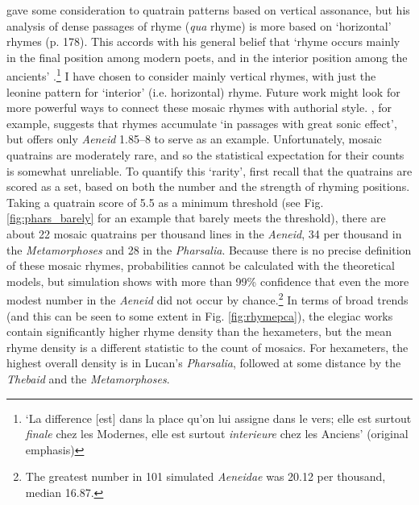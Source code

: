 \documentclass[twocolumn, switch, a4paper]{article} %
\begin{document}
  gave some consideration to quatrain
patterns based on vertical assonance, but his analysis of dense passages of
rhyme (\emph{qua} rhyme) is more based on `horizontal' rhymes (p. 178). This
accords with his general belief that `rhyme occurs mainly in the final
position among modern poets, and in the interior position among the ancients'
\cite[175]{herescu_poesie_1960}.\footnote{
  `La difference [est] dans la place qu'on lui assigne dans le vers; elle est
  surtout \emph{finale} chez les Modernes, elle est surtout \emph{interieure}
  chez les Anciens' (original emphasis)
}
I have chosen to consider mainly vertical rhymes, with just the leonine
pattern for `interior' (i.e. horizontal) rhyme. Future work might look for
more powerful ways to connect these mosaic rhymes with authorial style.
, for example, suggests that rhymes accumulate
`in passages with great sonic effect', but offers only \emph{Aeneid} 1.85--8
to serve as an example. Unfortunately, mosaic quatrains are moderately rare,
and so the statistical expectation for their counts is somewhat unreliable. To
quantify this `rarity', first recall that the quatrains are scored as a set,
based on both the number and the strength of rhyming positions. Taking a
quatrain score of 5.5 as a minimum threshold (see Fig. \ref{fig:phars_barely}
for an example that barely meets the threshold), there are about 22 mosaic
quatrains per thousand lines in the \emph{Aeneid}, 34 per thousand in the
\emph{Metamorphoses} and 28 in the \emph{Pharsalia}. Because there is no
precise definition of these mosaic rhymes, probabilities cannot be calculated
with the theoretical models, but simulation shows with more than 99\%
confidence that even the more modest number in the \emph{Aeneid} did not occur
by chance.\footnote{
  The greatest number in 101 simulated \emph{Aeneidae} was 20.12 per thousand,
  median 16.87.
}
In terms of broad trends (and this can be seen to some extent in Fig.
\ref{fig:rhymepca}), the elegiac works contain significantly higher rhyme
density than the hexameters, but the mean rhyme density is a different
statistic to the count of mosaics. For hexameters, the highest overall density
is in Lucan's \emph{Pharsalia}, followed at some distance by the
\emph{Thebaid} and the \emph{Metamorphoses}.
\end{document}
